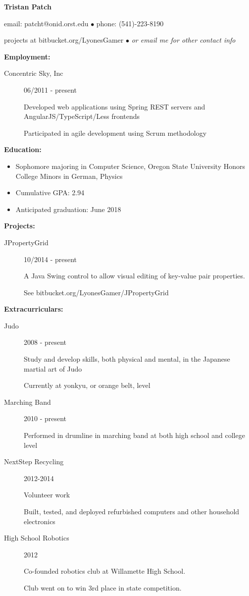 \documentclass[11pt]{article}
\begin{document}
\centerline{{\LARGE \bf Tristan Patch}}
\bigskip
\centerline{email: patcht@onid.orst.edu
$\bullet$
phone: (541)-223-8190}
\centerline{projects at bitbucket.org/LyonesGamer
$\bullet$
\emph{or email me for other contact info}}
\bigskip
\hrulefill
\bigskip
{\Large \bf Employment:}
\begin{description}
\item[Concentric Sky, Inc]
\hfill 06/2011 - present

Developed web applications using Spring REST servers and AngularJS/TypeScript/Less frontends

Participated in agile development using Scrum methodology
\end{description}
\smallskip
\hrulefill
\bigskip
{\Large \bf Education:}
\begin{itemize}
\setlength{\itemsep}{1pt}
\setlength{\parskip}{0pt}
\setlength{\parsep}{0pt}
\item Sophomore majoring in Computer Science, Oregon State University
Honors College
Minors in German, Physics
\item Cumulative GPA: 2.94
\item Anticipated graduation: June 2018
\end{itemize}
\smallskip
\hrulefill
\bigskip
{\Large \bf Projects:}
\begin{description}
\item[JPropertyGrid]
\hfill 10/2014 - present

A Java Swing control to allow visual editing of key-value pair properties.

See bitbucket.org/LyonesGamer/JPropertyGrid
\end{description}
\smallskip
\hrulefill
\bigskip
{\Large \bf Extracurriculars:}
\begin{description}
\item[Judo]
\hfill 2008 - present

Study and develop skills, both physical and mental, in the Japanese martial art of Judo

Currently at yonkyu, or orange belt, level

\item[Marching Band]
\hfill 2010 - present

Performed in drumline in marching band at both high school and college level

\item[NextStep Recycling]
\hfill 2012-2014

Volunteer work

Built, tested, and deployed refurbished computers and other household electronics


\item[High School Robotics]
\hfill 2012

Co-founded robotics club at Willamette High School.

Club went on to win 3rd place in state competition.
\end{description}
\end{document}
